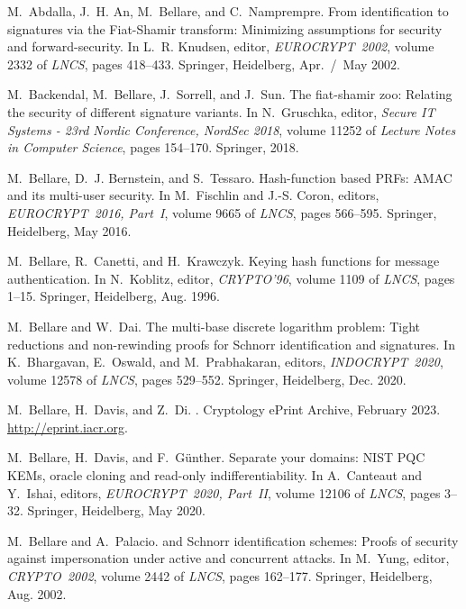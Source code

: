 \begin{thebibliography}{10}

M.~Abdalla, J.~H. An, M.~Bellare, and C.~Namprempre.
\newblock From identification to signatures via the {Fiat}-{Shamir} transform:
  Minimizing assumptions for security and forward-security.
\newblock In L.~R. Knudsen, editor, {\em EUROCRYPT~2002}, volume 2332 of {\em
  {LNCS}}, pages 418--433. Springer, Heidelberg, Apr.~/~May 2002.

M.~Backendal, M.~Bellare, J.~Sorrell, and J.~Sun.
\newblock The fiat-shamir zoo: Relating the security of different signature
  variants.
\newblock In N.~Gruschka, editor, {\em Secure {IT} Systems - 23rd Nordic
  Conference, NordSec 2018}, volume 11252 of {\em Lecture Notes in Computer
  Science}, pages 154--170. Springer, 2018.

M.~Bellare, D.~J. Bernstein, and S.~Tessaro.
\newblock Hash-function based {PRFs}: {AMAC} and its multi-user security.
\newblock In M.~Fischlin and J.-S. Coron, editors, {\em EUROCRYPT~2016,
  Part~I}, volume 9665 of {\em {LNCS}}, pages 566--595. Springer, Heidelberg,
  May 2016.

M.~Bellare, R.~Canetti, and H.~Krawczyk.
\newblock Keying hash functions for message authentication.
\newblock In N.~Koblitz, editor, {\em CRYPTO'96}, volume 1109 of {\em {LNCS}},
  pages 1--15. Springer, Heidelberg, Aug. 1996.

M.~Bellare and W.~Dai.
\newblock The multi-base discrete logarithm problem: Tight reductions and
  non-rewinding proofs for {Schnorr} identification and signatures.
\newblock In K.~Bhargavan, E.~Oswald, and M.~Prabhakaran, editors, {\em
  INDOCRYPT~2020}, volume 12578 of {\em {LNCS}}, pages 529--552. Springer,
  Heidelberg, Dec. 2020.

M.~Bellare, H.~Davis, and Z.~Di.
\newblock \titletextnocr.
\newblock Cryptology ePrint Archive, February 2023.
\newblock \url{http://eprint.iacr.org}.

M.~Bellare, H.~Davis, and F.~G{\"u}nther.
\newblock Separate your domains: {NIST} {PQC} {KEMs}, oracle cloning and
  read-only indifferentiability.
\newblock In A.~Canteaut and Y.~Ishai, editors, {\em EUROCRYPT~2020, Part~II},
  volume 12106 of {\em {LNCS}}, pages 3--32. Springer, Heidelberg, May 2020.

M.~Bellare and A.~Palacio.
 and {Schnorr} identification schemes: {Proofs} of security
  against impersonation under active and concurrent attacks.
\newblock In M.~Yung, editor, {\em CRYPTO~2002}, volume 2442 of {\em {LNCS}},
  pages 162--177. Springer, Heidelberg, Aug. 2002.


\end{thebibliography}

